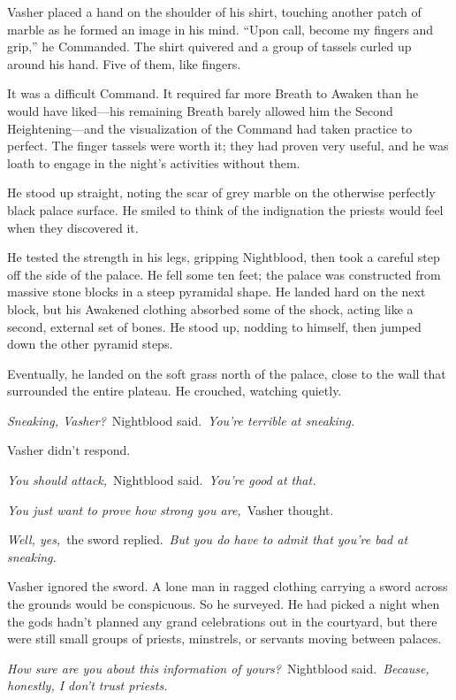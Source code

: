 Vasher placed a hand on the shoulder of his shirt, touching another patch of marble as he formed an image in his mind. “Upon call, become my fingers and grip,” he Commanded. The shirt quivered and a group of tassels curled up around his hand. Five of them, like fingers.

It was a difficult Command. It required far more Breath to Awaken than he would have liked—his remaining Breath barely allowed him the Second Heightening—and the visualization of the Command had taken practice to perfect. The finger tassels were worth it; they had proven very useful, and he was loath to engage in the night’s activities without them.

He stood up straight, noting the scar of grey marble on the otherwise perfectly black palace surface. He smiled to think of the indignation the priests would feel when they discovered it.

He tested the strength in his legs, gripping Nightblood, then took a careful step off the side of the palace. He fell some ten feet; the palace was constructed from massive stone blocks in a steep pyramidal shape. He landed hard on the next block, but his Awakened clothing absorbed some of the shock, acting like a second, external set of bones. He stood up, nodding to himself, then jumped down the other pyramid steps.

Eventually, he landed on the soft grass north of the palace, close to the wall that surrounded the entire plateau. He crouched, watching quietly.

\textit{Sneaking, Vasher?}~Nightblood said.~\textit{You’re terrible at sneaking.}

Vasher didn’t respond.

\textit{You should attack,}~Nightblood said.~\textit{You’re good at that.}

\textit{You just want to prove how strong you are,}~Vasher thought.

\textit{Well, yes,}~the sword replied.~\textit{But you do have to admit that you’re bad at sneaking.}

Vasher ignored the sword. A lone man in ragged clothing carrying a sword across the grounds would be conspicuous. So he surveyed. He had picked a night when the gods hadn’t planned any grand celebrations out in the courtyard, but there were still small groups of priests, minstrels, or servants moving between palaces.

\textit{How sure are you about this information of yours?}~Nightblood said.~\textit{Because, honestly, I don’t trust priests.}

